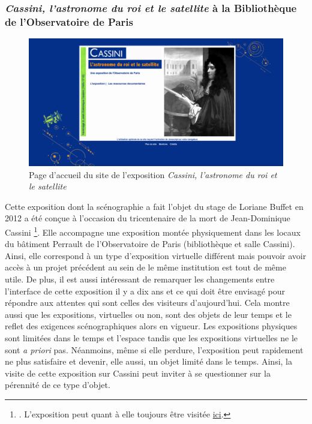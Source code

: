 	\subsubsection{\textit{Cassini, l'astronome du roi et le satellite} à la Bibliothèque de l'Observatoire de Paris}
	\begin{figure}[h]
	\caption{Page d'accueil du site de l'exposition \textit{Cassini, l'astronome du roi et le satellite}}
	\includegraphics[scale=0.3, angle=0]{images/partie1/expositions/expo-cassini.png}
    \centering
    \end{figure}
	Cette exposition dont la scénographie a fait l'objet du stage de Loriane Buffet en 2012 a été conçue à l'occasion du tricentenaire de la mort de Jean-Dominique Cassini \footnote{\cite{buffetHommageJeanDominiqueCassino2012}. L'exposition peut quant à elle toujours être visitée \href{http://expositions.obspm.fr/cassini/index.php}{ici}.}. Elle accompagne une exposition montée physiquement dans les locaux du bâtiment Perrault de l'Observatoire de Paris (bibliothèque et salle Cassini). Ainsi, elle correspond à un type d'exposition virtuelle différent mais pouvoir avoir accès à un projet précédent au sein de le même institution est tout de même utile. De plus, il est aussi intéressant de remarquer les changements entre l'interface de cette exposition il y a dix ans et ce qui doit être envisagé pour répondre aux attentes qui sont celles des visiteurs d'aujourd'hui. Cela montre aussi que les expositions, virtuelles ou non, sont des objets de leur temps et le reflet des exigences scénographiques alors en vigueur. Les expositions physiques sont limitées dans le temps et l'espace tandis que les expositions virtuelles ne le sont \textit{a priori} pas. Néanmoins, même si elle perdure, l'exposition peut rapidement ne plus satisfaire et devenir, elle aussi, un objet limité dans le temps. Ainsi, la visite de cette exposition sur Cassini peut inviter à se questionner sur la pérennité de ce type d'objet. 
	

